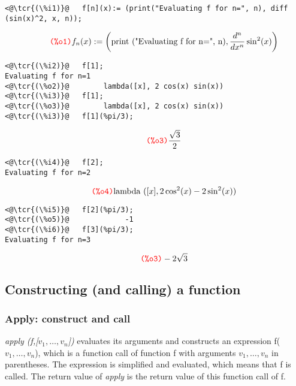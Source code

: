 \documentclass[../Maxima_Workbook.tex]{subfiles}
\begin{document}
\lz \begin{small}
\color{blue} \leqn
\begin{lstlisting}
<@\tcr{(\%i1)}@   f[n](x):= (print("Evaluating f for n=", n), diff (sin(x)^2, x, n));
\end{lstlisting}
\vspace{-5.5mm} \[ \tag*{\tcr{\ttfamily (\%o1)}} f_n(x) := \left( \text{print ("Evaluating f for n=", n)}, \frac{d^n}{dx^n} \sin^2(x) \right) \]
\vspace{-8mm} \begin{lstlisting}
<@\tcr{(\%i2)}@   f[1];
Evaluating f for n=1
<@\tcr{(\%o2)}@		   lambda([x], 2 cos(x) sin(x))
<@\tcr{(\%i3)}@   f[1];
<@\tcr{(\%o3)}@		   lambda([x], 2 cos(x) sin(x))
<@\tcr{(\%i3)}@   f[1](%pi/3);
\end{lstlisting}
\vspace{-5.5mm} \[ \tag*{\tcr{\ttfamily (\%o3)}} \frac{\sqrt{3}}{2} \]
\vspace{-9mm} \begin{lstlisting}
<@\tcr{(\%i4)}@   f[2];
Evaluating f for n=2
\end{lstlisting}
\vspace{-5.5mm} \[ \tag*{\tcr{\ttfamily (\%o4)}} \text{lambda } ([x], 2 \cos^2(x)-2 \sin^2(x)) \]
\vspace{-10.5mm} \begin{lstlisting}
<@\tcr{(\%i5)}@   f[2](%pi/3);
<@\tcr{(\%o5)}@				-1
<@\tcr{(\%i6)}@   f[3](%pi/3);
Evaluating f for n=3
\end{lstlisting}
\vspace{-6mm} \[ \tag*{\tcr{\ttfamily (\%o3)}} -2 \sqrt{3} \]
\color{black} \reqn
\end{small} \vspace{-8mm} 

\subsection{Constructing (and calling) a function}

\subsubsection{Apply: construct and call}

 \hfill \tcr{[function]} 

\lz \emph{apply (f,[$ v_1,\dots,v_n $])} evaluates its arguments and constructs an expression f($ v_1, \dots, v_n $), which is a function call of function f with arguments $ v_1,\dots,v_n $ in parentheses. The expression is simplified and evaluated, which means that f is called. The return value of \emph{apply} is the return value of this function call of f.
\end{document}
